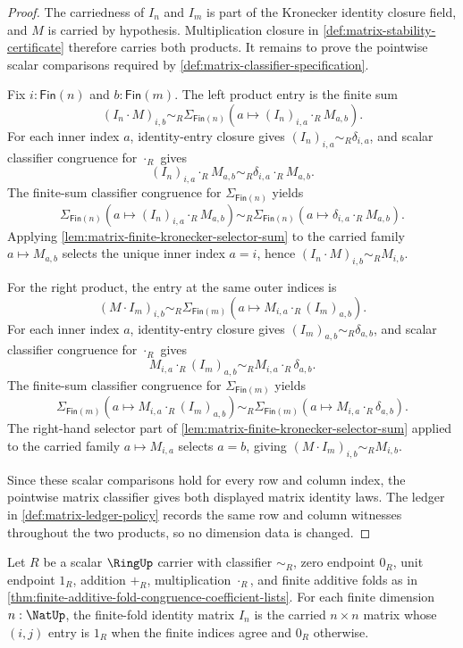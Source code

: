 \begin{proof}
The carriedness of $I_n$ and $I_m$ is part of the Kronecker identity closure
field, and $M$ is carried by hypothesis. Multiplication closure in
\autoref{def:matrix-stability-certificate} therefore carries both products.
It remains to prove the pointwise scalar comparisons required by
\autoref{def:matrix-classifier-specification}.

Fix $i:\mathsf{Fin}(n)$ and $b:\mathsf{Fin}(m)$. The left product entry is the
finite sum
$$
(I_n\cdot M)_{i,b}
\sim_R
\Sigma_{\mathsf{Fin}(n)}(a\mapsto (I_n)_{i,a}\cdot_R M_{a,b}).
$$
For each inner index $a$, identity-entry closure gives
$(I_n)_{i,a}\sim_R\delta_{i,a}$, and scalar classifier congruence for
$\cdot_R$ gives
$$
(I_n)_{i,a}\cdot_R M_{a,b}
\sim_R
\delta_{i,a}\cdot_R M_{a,b}.
$$
The finite-sum classifier congruence for $\Sigma_{\mathsf{Fin}(n)}$ yields
$$
\Sigma_{\mathsf{Fin}(n)}(a\mapsto (I_n)_{i,a}\cdot_R M_{a,b})
\sim_R
\Sigma_{\mathsf{Fin}(n)}(a\mapsto \delta_{i,a}\cdot_R M_{a,b}).
$$
Applying \autoref{lem:matrix-finite-kronecker-selector-sum} to the carried
family $a\mapsto M_{a,b}$ selects the unique inner index $a=i$, hence
$(I_n\cdot M)_{i,b}\sim_R M_{i,b}$.

For the right product, the entry at the same outer indices is
$$
(M\cdot I_m)_{i,b}
\sim_R
\Sigma_{\mathsf{Fin}(m)}(a\mapsto M_{i,a}\cdot_R (I_m)_{a,b}).
$$
For each inner index $a$, identity-entry closure gives
$(I_m)_{a,b}\sim_R\delta_{a,b}$, and scalar classifier congruence for
$\cdot_R$ gives
$$
M_{i,a}\cdot_R (I_m)_{a,b}
\sim_R
M_{i,a}\cdot_R \delta_{a,b}.
$$
The finite-sum classifier congruence for $\Sigma_{\mathsf{Fin}(m)}$ yields
$$
\Sigma_{\mathsf{Fin}(m)}(a\mapsto M_{i,a}\cdot_R (I_m)_{a,b})
\sim_R
\Sigma_{\mathsf{Fin}(m)}(a\mapsto M_{i,a}\cdot_R \delta_{a,b}).
$$
The right-hand selector part of
\autoref{lem:matrix-finite-kronecker-selector-sum} applied to the carried
family $a\mapsto M_{i,a}$ selects $a=b$, giving
$(M\cdot I_m)_{i,b}\sim_R M_{i,b}$.

Since these scalar comparisons hold for every row and column index, the
pointwise matrix classifier gives both displayed matrix identity laws. The
ledger in \autoref{def:matrix-ledger-policy} records the same row and column
witnesses throughout the two products, so no dimension data is changed.
\end{proof}

\begin{definition}
\label{def:finite-fold-matrix-identity-data}
Let $R$ be a scalar $\RingUp$ carrier with classifier $\sim_R$, zero endpoint
$0_R$, unit endpoint $1_R$, addition $+_R$, multiplication $\cdot_R$, and finite
additive folds as in \autoref{thm:finite-additive-fold-congruence-coefficient-lists}. For each finite
dimension $n:\NatUp$, the finite-fold identity matrix $I_n$ is the carried
$n\times n$ matrix whose $(i,j)$ entry is $1_R$ when the finite indices agree
and $0_R$ otherwise.
\end{definition}


